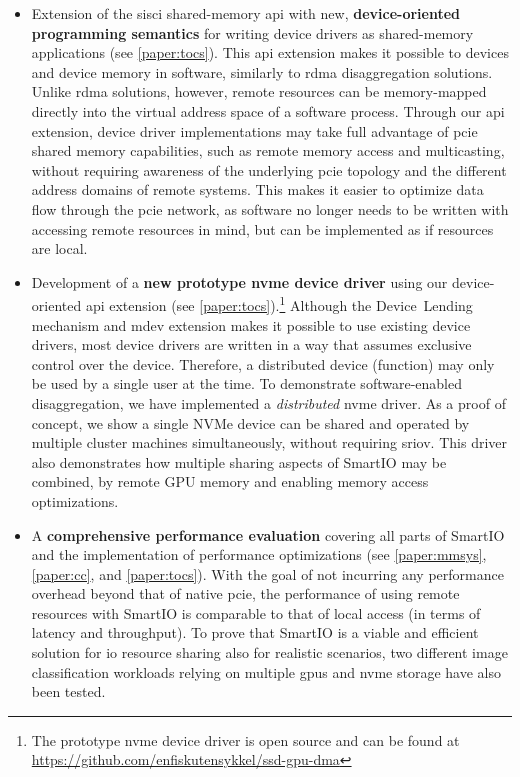 \begin{itemize}
    \item Extension of the \gls{sisci} shared-memory \gls{api} with new, \textbf{device-oriented programming semantics} for writing device drivers as shared-memory applications (see \cref{paper:tocs}).
	This \gls{api} extension makes it possible to  devices and device memory in software, similarly to \gls{rdma} \gls{disaggregation} solutions.
	Unlike \gls{rdma} solutions, however, remote resources can be memory-mapped directly into the virtual address space of a software process.
	Through our \gls{api} extension, device driver implementations may take full advantage of \gls{pcie} shared memory capabilities, such as remote memory access and multicasting, without requiring awareness of the underlying \gls{pcie} topology and the different address domains of remote systems.
	This makes it easier to optimize data flow through the \gls{pcie} network, as software no longer needs to be written with accessing remote resources in mind, but can be implemented as if resources are local.

    \item Development of a \textbf{new prototype \gls{nvme} device driver} using our device-oriented \gls{api} extension (see \cref{paper:tocs}).\footnote{The prototype \gls{nvme} device driver is open source and can be found at \mbox{\url{https://github.com/enfiskutensykkel/ssd-gpu-dma}}}
    Although the Device~Lending mechanism and \gls{mdev} extension makes it possible to use existing device drivers, most device drivers are written in a way that assumes exclusive control over the device. Therefore, a distributed device (function) may only be used by a single user at the time.
    To demonstrate software-enabled \gls{disaggregation}, we have implemented a \emph{distributed} \gls{nvme} driver. As a proof of concept, we show a single NVMe device can be shared and operated by multiple cluster machines simultaneously, without requiring \gls{sriov}.
	This driver also demonstrates how multiple sharing aspects of SmartIO may be combined, 
	by  remote GPU memory and enabling memory access optimizations.

    \item A \textbf{comprehensive performance evaluation} covering all parts of SmartIO and the implementation of performance optimizations (see \cref{paper:mmsys}, \cref{paper:cc}, and \cref{paper:tocs}). With the goal of not incurring any performance overhead beyond that of native \gls{pcie}, the performance of using remote resources with SmartIO is comparable to that of local access (in terms of latency and throughput).
        To prove that SmartIO is a viable and efficient solution for \gls{io} resource sharing also for realistic scenarios, two different image classification workloads relying on multiple \glspl{gpu} and \gls{nvme} storage have also been tested.
	
\end{itemize}
